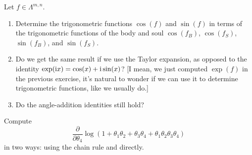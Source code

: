 \begin{exercise}
  Let $f\in\Lambda^{m,n}$.
  \begin{enumerate}
  \item Determine the trigonometric functions $\cos(f)$ and $\sin(f)$ in terms
of the trigonometric functions of the body and soul $\cos(f_{B})$,
$\cos(f_{S})$, $\sin(f_{B})$, and $\sin(f_{S})$.
\item Do we get the same result if we use the Taylor expansion, as opposed to
the identity $\exp(\mathrm{i} x)=\cos(x)+\mathrm{i}\sin(x)$? [I mean, we just computed
  $\exp(f)$ in the previous exercise, it's natural to wonder if we can
  use it to determine trigonometric functions, like we usually do.]
\item Do the angle-addition identities still hold?
  \end{enumerate}
\end{exercise}


\begin{exercise}[A.~Schwarz 2008]
  Compute
  \begin{equation}
\frac{\partial}{\partial\theta_{4}}\log(1 + \theta_{1}\theta_{2} + \theta_{3}\theta_{4}
+ \theta_{1}\theta_{2}\theta_{3}\theta_{4})
  \end{equation}
in two ways: using the chain rule and directly.
\end{exercise}
